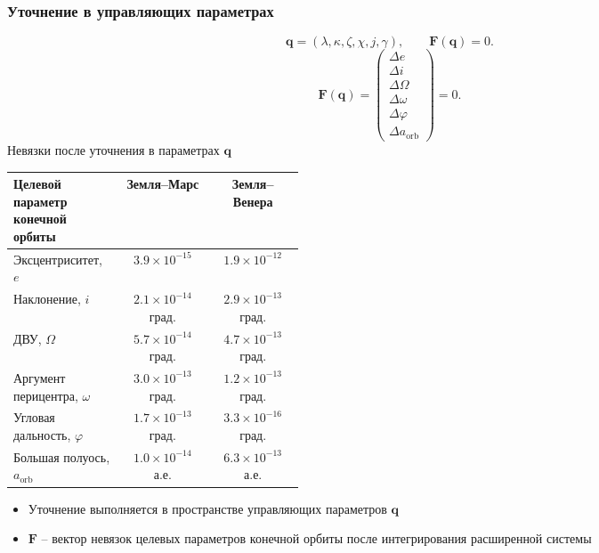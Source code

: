 \begin{frame}
    \frametitle{Уточнение в управляющих параметрах}
    \presentationtextsize
    \[
    \mathbf q=(\lambda,\kappa,\zeta,\chi,j,\gamma),
    \qquad
    \mathbf F(\mathbf q)=0.
    \]
    \[
    \mathbf F(\boldsymbol q)
    =
    \begin{pmatrix}
    \Delta e\\
    \Delta i\\
    \Delta\Omega\\
    \Delta\omega\\
    \Delta\varphi\\
    \Delta a_{\mathrm{orb}}
    \end{pmatrix}
    =0.
    \]
    \centering
    Невязки после уточнения в параметрах \(\boldsymbol q\)
    \begin{tabular}{@{}p{0.38\linewidth}cc@{}}
        \toprule
        Целевой параметр конечной орбиты & Земля--Марс & Земля--Венера \\
        \midrule
        Эксцентриситет, \(e\) & \(3.9\times10^{-15}\) & \(1.9\times10^{-12}\) \\
        Наклонение, \(i\) & \(2.1\times10^{-14}\) град. & \(2.9\times10^{-13}\) град. \\
        ДВУ, \(\Omega\) & \(5.7\times10^{-14}\) град. & \(4.7\times10^{-13}\) град. \\
        Аргумент перицентра, \(\omega\) & \(3.0\times10^{-13}\) град. & \(1.2\times10^{-13}\) град. \\
        Угловая дальность, \(\varphi\) & \(1.7\times10^{-13}\) град. & \(3.3\times10^{-16}\) град. \\
        Большая полуось, \(a_{\mathrm{orb}}\) & \(1.0\times10^{-14}\) а.е. & \(6.3\times10^{-13}\) а.е. \\
        \bottomrule
    \end{tabular}
    \begin{itemize}
        \item Уточнение выполняется в пространстве управляющих параметров \(\boldsymbol q\)
        \item \(\mathbf F\) -- вектор невязок целевых параметров конечной орбиты после интегрирования расширенной системы
    \end{itemize}
\end{frame}

